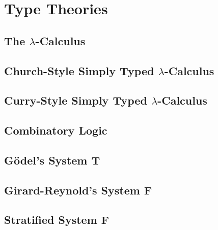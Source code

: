 \documentclass[phd,appendix,dedicationpage,ackpage,epigraphpage]{uithesis}
\begin{document}
\appendix

\chapter{Type Theories}
\label{chap:type_theories}
\section{The $\lambda$-Calculus}
\label{sec:the_lambda-calculus}
\Lamall{}

\newpage
\section{Church-Style Simply Typed $\lambda$-Calculus}
\label{sec:church_style_simply_typed_lambda-calculus}
\CHSTLCall{}

\newpage
\section{Curry-Style Simply Typed $\lambda$-Calculus}
\label{sec:curry_style_simply_typed_lambda-calculus}
\CSTLCall{}

\newpage
\section{Combinatory Logic}
\label{sec:combinatory_logic}
\Comball{}

\newpage
\section{G\"odel's System T}
\label{sec:godels_system_t}
\Tall{}

\newpage
\section{Girard-Reynold's System F}
\label{sec:girard-reynolds_system_f}
\Fall{}

\newpage
\section{Stratified System F}
\label{sec:stratified_system_f}
\SSFall{}
\end{document}
